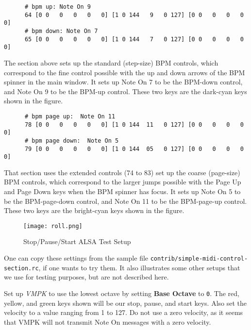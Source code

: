    \begin{verbatim}
      # bpm up: Note On 9
      64 [0 0   0   0   0   0] [1 0 144   9   0 127] [0 0   0   0   0   0]
      # bpm down: Note On 7
      65 [0 0   0   0   0   0] [1 0 144   7   0 127] [0 0   0   0   0   0]
   \end{verbatim}

   The section above sets up the standard (step-size) BPM controls, which
   correspond to the fine control possible with the up and down arrows of the
   BPM spinner in the main window.  It sets up Note On 7 to be the BPM-down
   control, and Note On 9 to be the BPM-up control.  These two keys are the
   dark-cyan keys shown in the figure.

   \begin{verbatim}
      # bpm page up:  Note On 11
      78 [0 0   0   0   0   0] [1 0 144  11   0 127] [0 0   0   0   0   0]
      # bpm page down:  Note On 5
      79 [0 0   0   0   0   0] [1 0 144  05   0 127] [0 0   0   0   0   0]
   \end{verbatim}

   That section uses the extended controls (74 to 83) set up the coarse
   (page-size) BPM controls, which correspond to the larger jumps possible with
   the Page Up and Page Down keys when the BPM spinner has focus.  It sets up
   Note On 5 to be the BPM-page-down control, and Note On 11 to be the
   BPM-page-up control.  These two keys are
   the bright-cyan keys shown in the figure.

\begin{figure}[H]
   \centering 
   \texttt{[image: roll.png]}
   \caption{Stop/Pause/Start ALSA Test Setup}
   \label{fig:rc_file_stop_pause_start_alsa_test_setup}
\end{figure}

   One can copy these settings from the sample file
   \texttt{contrib/simple-midi-control-section.rc}, if one wants to
   try them.  It also illustrates some other setups that we use for testing
   purposes, but are not described here.

   Set up \textsl{VMPK} to use the lowest octave by setting
   \textbf{Base Octave} to \texttt{0}.  The red, yellow, and green
   keys shown will be our stop, pause, and start keys.
   Also set the velocity to a value ranging from 1 to 127.
   Do not use a zero velocity, as it seems that VMPK will not transmit Note On
   messages with a zero velocity.

